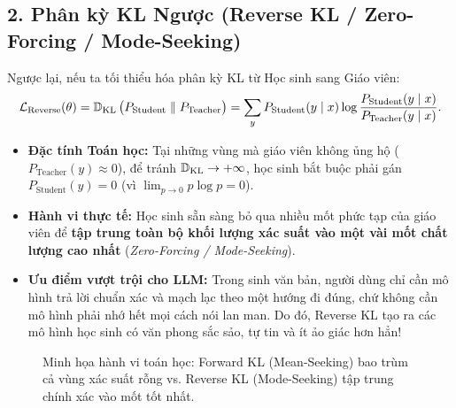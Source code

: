 \subsection{2. Phân kỳ KL Ngược (Reverse KL / Zero-Forcing / Mode-Seeking)}
Ngược lại, nếu ta tối thiểu hóa phân kỳ KL từ Học sinh sang Giáo viên:
\begin{equation}
    \mathcal{L}_{\text{Reverse}}(\theta) = \operatorname{\mathbb{D}_{\mathrm{KL}}}\big(P_{\text{Student}} \parallel P_{\text{Teacher}}\big) = \sum_{y} P_{\text{Student}}(y \mid x) \log \frac{P_{\text{Student}}(y \mid x)}{P_{\text{Teacher}}(y \mid x)}.
    \label{eq:reverse_kl_kd}
\end{equation}
\begin{itemize}[leftmargin=1.2cm]
    \item \textbf{Đặc tính Toán học:} Tại những vùng mà giáo viên không ủng hộ ($P_{\text{Teacher}}(y) \approx 0$), để tránh $\operatorname{\mathbb{D}_{\mathrm{KL}}} \to +\infty$, học sinh bắt buộc phải gán $P_{\text{Student}}(y) = 0$ (vì $\lim_{p \to 0} p \log p = 0$).
    \item \textbf{Hành vi thực tế:} Học sinh sẵn sàng bỏ qua nhiều mốt phức tạp của giáo viên để \textbf{tập trung toàn bộ khối lượng xác suất vào một vài mốt chất lượng cao nhất} (\textit{Zero-Forcing / Mode-Seeking}).
    \item \textbf{Ưu điểm vượt trội cho LLM:} Trong sinh văn bản, người dùng chỉ cần mô hình trả lời chuẩn xác và mạch lạc theo một hướng đi đúng, chứ không cần mô hình phải nhớ hết mọi cách nói lan man. Do đó, Reverse KL tạo ra các mô hình học sinh có văn phong sắc sảo, tự tin và ít ảo giác hơn hẳn!
\end{itemize}

\begin{figure}[h!]
\centering
{}
\caption{Minh họa hành vi toán học: Forward KL (Mean-Seeking) bao trùm cả vùng xác suất rỗng vs. Reverse KL (Mode-Seeking) tập trung chính xác vào mốt tốt nhất.}
\label{fig:forward_vs_reverse_kl}
\end{figure}

